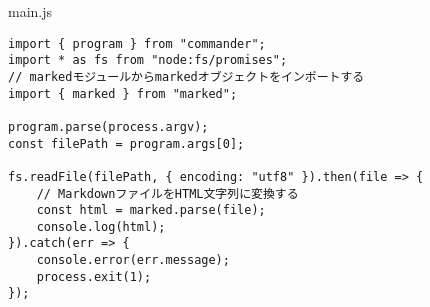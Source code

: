 \begin{listtitle}
main.js
\end{listtitle}
\begin{lstlisting}
import { program } from "commander";
import * as fs from "node:fs/promises";
// markedモジュールからmarkedオブジェクトをインポートする
import { marked } from "marked";

program.parse(process.argv);
const filePath = program.args[0];

fs.readFile(filePath, { encoding: "utf8" }).then(file => {
    // MarkdownファイルをHTML文字列に変換する
    const html = marked.parse(file);
    console.log(html);
}).catch(err => {
    console.error(err.message);
    process.exit(1);
});
\end{lstlisting}
\listend
